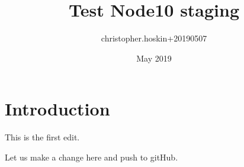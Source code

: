\documentclass{article}
\title{Test Node10 staging}
\author{christopher.hoskin+20190507 }
\date{May 2019}
\begin{document}
\maketitle

\section{Introduction}

This is the first edit.

\cite{}

Let us make a change here and push to gitHub.
\end{document}
